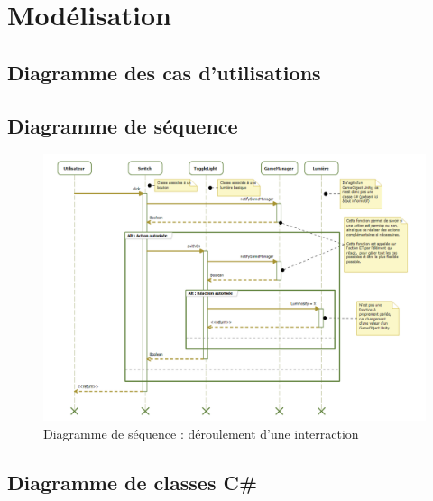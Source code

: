 \section{Modélisation}

\subsection{Diagramme des cas d’utilisations}

\subsection{Diagramme de séquence}
\begin{figure}[h]
    \centering
    \includegraphics[width=\textwidth]{4-Conception/img/diagSequenceLight.png}
    \caption{Diagramme de séquence : déroulement d'une interraction}
    \label{fig:sequence_diagram}
\end{figure}

\subsection{Diagramme de classes C\#}

